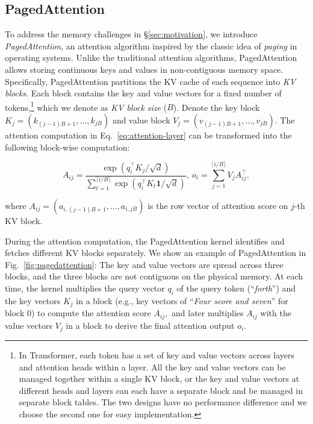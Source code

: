 \subsection{PagedAttention}
\label{sec:pagedattention}

To address the memory challenges in \S\ref{sec:motivation}, we introduce \emph{PagedAttention}, an attention algorithm inspired by the classic idea of \emph{paging} \cite{kilburn1962one} in operating systems. Unlike the traditional attention algorithms, PagedAttention allows storing continuous keys and values in non-contiguous memory space. Specifically, PagedAttention partitions the KV cache of each sequence into \emph{KV blocks}. Each block contains the key and value vectors for a fixed number of tokens,\footnote{In Transformer, each token has a set of key and value vectors across layers and attention heads within a layer. All the key and value vectors can be managed together within a single KV block, or the key and value vectors at different heads and layers can each have a separate block and be managed in separate block tables. The two designs have no performance difference and we choose the second one for easy implementation.}  which we denote as \emph{KV block size} ($B$). Denote the key block $K_j = (k_{(j - 1) B + 1}, \ldots, k_{jB})$ and value block $V_j = (v_{(j - 1) B + 1}, \ldots, v_{jB}).$ The attention computation in Eq.~\ref{eq:attention-layer} can be transformed into the following block-wise computation:

\begin{equation}
A_{ij} = \frac{\exp(q_i^\top K_j / \sqrt{d})}{\sum_{t=1}^{\lceil i/B \rceil}\exp(q_i^\top K_t\mathbf{1} / \sqrt{d})}, \ o_i = \sum_{j=1}^{\lceil i/B \rceil} V_j A_{ij}^\top, \label{eq:attention-layer}
\end{equation}

where $A_{ij} = (a_{i,(j - 1) B + 1}, \ldots, a_{i,jB})$ is the row vector of attention score on $j$-th KV block.

During the attention computation, the PagedAttention kernel identifies and fetches different KV blocks separately. We show an example of PagedAttention in Fig.~\ref{fig:pagedattention}: The key and value vectors are spread across three blocks, and the three blocks are not contiguous on the physical memory. At each time, the kernel multiplies the query vector $q_i$ of the query token (``\emph{forth}'') and the key vectors $K_j$ in a block (e.g., key vectors of ``\emph{Four score and seven}'' for block 0) to compute the attention score $A_{ij},$ and later multiplies $A_{ij}$ with the value vectors $V_j$ in a block to derive the final attention output $o_i.$ 

